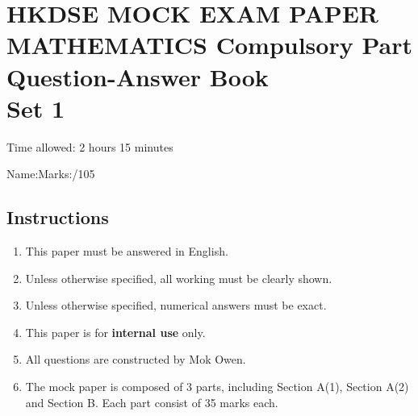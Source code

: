 \documentclass[12pt]{article}
\begin{document}
    \thispagestyle{plain}

    \centering 

    \section*{HKDSE MOCK EXAM PAPER\\MATHEMATICS Compulsory Part\\Question-Answer Book\\Set 1}

    Time allowed: 2 hours 15 minutes

    Name:\hrulefill \hfill Marks:\hrulefill/105

    \raggedright

    \subsection*{Instructions}

    \begin{enumerate}
        \item This paper must be answered in English.
        \item Unless otherwise specified, all working must be clearly shown.
        \item Unless otherwise specified, numerical answers must be exact.
        \item This paper is for \textbf{internal use} only.
        \item All questions are constructed by Mok Owen.
        \item The mock paper is composed of 3 parts, including Section A(1), Section A(2) and Section B. Each part consist of 35 marks each.
    \end{enumerate}

    \newpage
\end{document}
